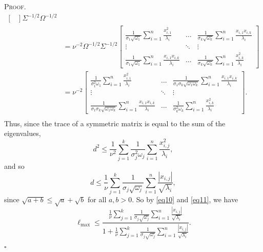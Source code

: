\documentclass[12pt]{article}
\newcounter{ProofCounter}
\newenvironment{Proof}{\stepcounter{ProofCounter}\textsc{Proof.}}{\hfill$\square$}
\numberwithin{equation}{section}
\begin{document}
\begin{Proof}
\begin{align*}
\begin{bmatrix}
    \end{bmatrix} \Sigma^{-1/2} \Omega^{-1/2} \\
    & = \nu^{-2} \Omega^{-1/2}\Sigma^{-1/2} \begin{bmatrix}
      \frac{1}{\sigma_1 \sqrt{\omega_1}}\sum_{i=1}^{n}\frac{x_{i,1}^2}{\lambda_i} & \dots & \frac{1}{\sigma_k\sqrt{\omega_k}}\sum_{i=1}^{n}\frac{ x_{i,1}x_{i,k}}{\lambda_i} \\
      \vdots & \ddots & \vdots \\
      \frac{1}{\sigma_1 \sqrt{\omega_1}}\sum_{i=1}^{n} \frac{x_{i,1}x_{i,k}}{\lambda_i} & \dots & \frac{1}{\sigma_k\sqrt{\omega_k}}\sum_{i=1}^{n}\frac{ x_{i,k}^2}{\lambda_i}
    \end{bmatrix}  \\
    & = \nu^{-2} \begin{bmatrix}
      \frac{1}{\sigma_1^2 \omega_1}\sum_{i=1}^{n}\frac{x_{i,1}^2}{\lambda_i} & \dots & \frac{1}{\sigma_1\sigma_k\sqrt{\omega_1\omega_k}}\sum_{i=1}^{n}\frac{ x_{i,1}x_{i,k}}{\lambda_i} \\
      \vdots & \ddots & \vdots \\
      \frac{1}{\sigma_1\sigma_k \sqrt{\omega_1\omega_k}}\sum_{i=1}^{n} \frac{x_{i,1}x_{i,k}}{\lambda_i} & \dots & \frac{1}{\sigma_k^2\omega_k}\sum_{i=1}^{n}\frac{ x_{i,k}^2}{\lambda_i}
    \end{bmatrix}.  \\
  \end{align*}
  Thus, since the trace of a symmetric matrix is equal to the sum of the eigenvalues, 
  \begin{equation*}
    d^2 \leq \frac{1}{\nu^{2}} \sum_{j=1}^{k} \frac{1}{\sigma_j^2 \omega_j} \sum_{i=1}^{n} \frac{x_{i,j}^2}{\lambda_i},
  \end{equation*}
  and so 
  \begin{equation}
    d \leq \frac{1}{\nu} \sum_{j=1}^{k} \frac{1}{\sigma_j \sqrt{\omega_j}} \sum_{i=1}^{n} \frac{|x_{i,j}|}{\sqrt{\lambda_i}},
    \label{eq11}
  \end{equation}
  since $\sqrt{a + b} \leq \sqrt{a} + \sqrt{b}$ for all $a, b > 0$. So by \eqref{eq10} and \eqref{eq11}, we have
  \begin{equation}
    \ell_{\max} \leq \frac{ \frac{1}{\nu} \sum_{j=1}^{k} \frac{1}{\sigma_j \sqrt{\omega_j}} \sum_{i=1}^{n} \frac{|x_{i,j}|}{\sqrt{\lambda_i}} }{ 1 + 
    \frac{1}{\nu} \sum_{j=1}^{k} \frac{1}{\sigma_j \sqrt{\omega_j}} \sum_{i=1}^{n} \frac{|x_{i,j}|}{\sqrt{\lambda_i}} }.
    \label{eq12}
  \end{equation}

\end{Proof}
\end{document}
